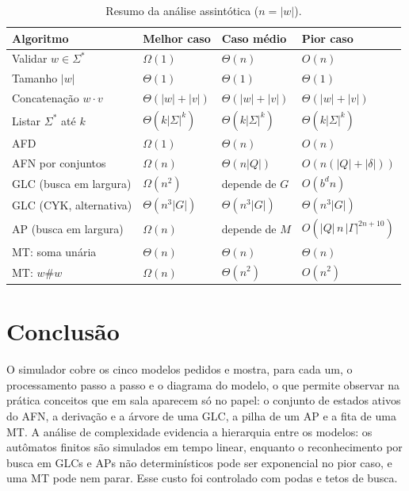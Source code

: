 \documentclass[12pt,a4paper]{article}
\begin{document}
\begin{table}[htbp]
  \centering
  \caption{Resumo da análise assintótica ($n = |w|$).}
  \label{tab:complexidade}
  \small
  \begin{tabular}{llll}
    \toprule
    Algoritmo & Melhor caso & Caso médio & Pior caso \\
    \midrule
    Validar $w \in \Sigma^*$ & $\Omega(1)$ & $\Theta(n)$ & $O(n)$ \\
    Tamanho $|w|$ & $\Theta(1)$ & $\Theta(1)$ & $\Theta(1)$ \\
    Concatenação $w \cdot v$ & $\Theta(|w|+|v|)$ & $\Theta(|w|+|v|)$ & $\Theta(|w|+|v|)$ \\
    Listar $\Sigma^*$ até $k$ & $\Theta(k|\Sigma|^k)$ & $\Theta(k|\Sigma|^k)$ & $\Theta(k|\Sigma|^k)$ \\
    AFD & $\Omega(1)$ & $\Theta(n)$ & $O(n)$ \\
    AFN por conjuntos & $\Omega(n)$ & $\Theta(n|Q|)$ & $O(n(|Q|+|\delta|))$ \\
    GLC (busca em largura) & $\Omega(n^2)$ & depende de $G$ & $O(b^d n)$ \\
    GLC (CYK, alternativa) & $\Theta(n^3|G|)$ & $\Theta(n^3|G|)$ & $\Theta(n^3|G|)$ \\
    AP (busca em largura) & $\Omega(n)$ & depende de $M$ & $O(|Q|\,n\,|\Gamma|^{2n+10})$ \\
    MT: soma unária & $\Theta(n)$ & $\Theta(n)$ & $\Theta(n)$ \\
    MT: $w\#w$ & $\Omega(n)$ & $\Theta(n^2)$ & $O(n^2)$ \\
    \bottomrule
  \end{tabular}
\end{table}

\section{Conclusão}

O simulador cobre os cinco modelos pedidos e mostra, para cada um, o
processamento passo a passo e o diagrama do modelo, o que permite observar na
prática conceitos que em sala aparecem só no papel: o conjunto de estados
ativos do AFN, a derivação e a árvore de uma GLC, a pilha de um AP e a fita
de uma MT. A análise de complexidade evidencia a hierarquia entre os
modelos: os autômatos finitos são simulados em tempo linear, enquanto o
reconhecimento por busca em GLCs e APs não determinísticos pode ser
exponencial no pior caso, e uma MT pode nem parar. Esse custo foi controlado
com podas e tetos de busca.
\end{document}
